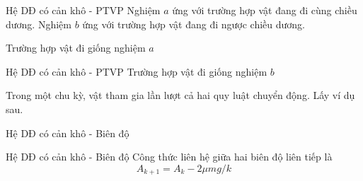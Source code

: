 \begin{frame}{Hệ DĐ có cản khô - PTVP}
    Nghiệm \(a\) ứng với trường hợp vật đang đi cùng chiều dương. Nghiệm \(b\) ứng với trường hợp vật đang đi ngược chiều dương. 
    \vspace{2mm}

    Trường hợp vật đi giống nghiệm \(a\)
    \vspace{5mm}
    
    \begin{center}
        
    \end{center}
\end{frame}
\begin{frame}{Hệ DĐ có cản khô - PTVP}
    Trường hợp vật đi giống nghiệm \(b\)
    \vspace{5mm}
    
    \begin{center}
        
    \end{center}
    Trong một chu kỳ, vật tham gia lần lượt cả hai quy luật chuyển động. Lấy ví dụ sau.

\end{frame}
\begin{frame}{Hệ DĐ có cản khô - Biên độ}
    \begin{center}
        \scalebox{0.6}{}
    \end{center}
\end{frame}
\begin{frame}{Hệ DĐ có cản khô - Biên độ}
    Công thức liên hệ giữa hai biên độ liên tiếp là 
    \begin{equation}
        A_{k+1} = A_k - 2 \mu mg/k
    \end{equation}
\end{frame}
